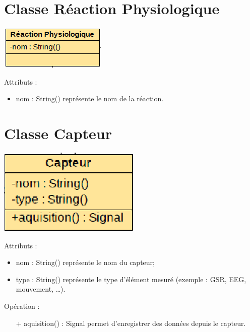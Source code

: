 \documentclass{article}
\begin{document}
	\section{Classe Réaction Physiologique}
		\begin{center}
			\includegraphics[scale=0.5]{include/Classe_Reaction_Physiologique.PNG}\newline
		\end{center}
		Attributs :
		\begin{itemize}
			\item nom : String() représente le nom de la réaction.
		\end{itemize}

	\section{Classe Capteur}
		\begin{center}
			\includegraphics[scale=0.5]{include/Classe_Capteur.PNG}\newline
		\end{center}
		Attributs :
		\begin{itemize}
			\item nom : String() représente le nom du capteur;
			\item type : String() représente le type d’élément mesuré (exemple : GSR, EEG, mouvement, …).
		\end{itemize}
		\medskip
		Opération :
		\begin{itemize}
			\item[+] aquisition() : Signal permet d’enregistrer des données depuis le capteur.
		\end{itemize}
\end{document}
